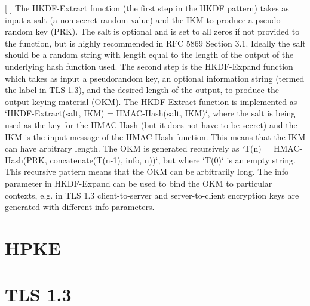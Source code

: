 [ ] The HKDF-Extract function (the first step in the HKDF pattern) takes as input a salt (a non-secret random value) and the IKM to produce a pseudo-random key (PRK). The salt is optional and is set to all zeros if not provided to the function, but is highly recommended in RFC 5869 Section 3.1. Ideally the salt should be a random string with length equal to the length of the output of the underlying hash function used. The second step is the HKDF-Expand  function which takes as input a pseudorandom key, an optional information string (termed the label in TLS 1.3), and the desired length of the output, to produce the output keying material (OKM). The HKDF-Extract function is implemented as `HKDF-Extract(salt, IKM) = HMAC-Hash(salt, IKM)`, where the salt is being used as the key for the HMAC-Hash (but it does not have to be secret) and the IKM is the input message of the HMAC-Hash function. This means that the IKM can have arbitrary length. The OKM is generated recursively as `T(n) = HMAC-Hash(PRK, concatenate(T(n-1), info, n))`, but where `T(0)` is an empty string. This recursive pattern means that the OKM can be arbitrarily long. The info parameter in HKDF-Expand can be used to bind the OKM to particular contexts, e.g. in TLS 1.3 client-to-server and server-to-client encryption keys are generated with different info parameters. 

\section{HPKE}

\section{TLS 1.3}
